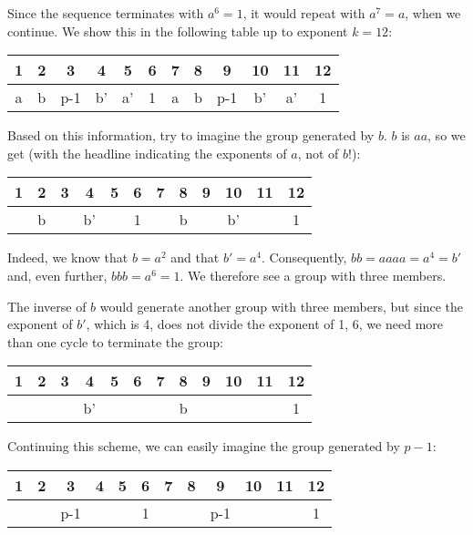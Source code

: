 \documentclass{scrreprt}
\begin{document}
Since the sequence terminates with $a^6 = 1$,
it would repeat with $a^7=a$, when we continue.
We show this in the following table up to exponent $k=12$:

\begin{center}
\begin{tabular}{|c|c|c|c|c|c|c|c|c|c|c|c}
 1 &  2 &  3 &  4 &  5 &  6 &  7 &  8 &  9 & 10 & 11 & 12 \\\hline
 a &  b & p-1& b' & a' &  1 &  a &  b &p-1 & b' & a' & 1 
\end{tabular}
\end{center}

Based on this information, try to imagine the group
generated by $b$. $b$ is $aa$, so we get (with the headline
indicating the exponents of $a$, not of $b$!):

\begin{center}
\begin{tabular}{|c|c|c|c|c|c|c|c|c|c|c|c}
 1 &  2 &  3 &  4 &  5 &  6 &  7 &  8 &  9 & 10 & 11 & 12 \\\hline
   &  b &    & b' &    &  1 &    &  b &    & b' &    &  1   
\end{tabular}
\end{center}

Indeed, we know that $b=a^2$ and that $b'=a^4$.
Consequently, $bb = aaaa = a^4 = b'$ and,
even further, $bbb = a^6 = 1$.
We therefore see a group with three members.

The inverse of $b$ would generate another group with three members,
but since the exponent of $b'$, which is 4, does not divide
the exponent of 1, 6, 
we need more than one cycle to terminate the group:

\begin{center}
\begin{tabular}{|c|c|c|c|c|c|c|c|c|c|c|c}
 1 &  2 &  3 &  4 &  5 &  6 &  7 &  8 &  9 & 10 & 11 & 12 \\\hline
   &    &    & b' &    &    &    &  b &    &    &    &  1   
\end{tabular}
\end{center}

Continuing this scheme, we can easily imagine
the group generated by $p-1$:

\begin{center}
\begin{tabular}{|c|c|c|c|c|c|c|c|c|c|c|c}
 1 &  2 &  3 &  4 &  5 &  6 &  7 &  8 &  9 & 10 & 11 & 12 \\\hline
   &    &p-1 &    &    &  1 &    &    &p-1 &    &    &  1   
\end{tabular}
\end{center}
\end{document}
